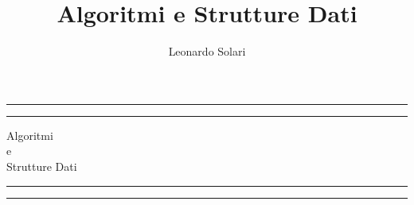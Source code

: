 \documentclass[a4paper]{article}
\title{\huge Algoritmi e Strutture Dati}
\author{Leonardo Solari}
\date{}
\begin{document}


\begin{titlepage}
	\centering %
	\scshape %
	\vspace*{1.5\baselineskip} %

	\rule{13cm}{1.6pt}\vspace*{-\baselineskip}\vspace*{2pt} %
	\rule{13cm}{0.4pt} %
	
		\vspace{0.75\baselineskip} %
	{	\Huge Algoritmi \\ 
			\vspace{4mm}  
			e \\
			\vspace{4mm}
		Strutture Dati \\	}
		\vspace{0.75\baselineskip} %
	\rule{13cm}{0.4pt}\vspace*{-\baselineskip}\vspace{3.2pt} %
	\rule{13cm}{1.6pt} %
	

\end{titlepage}
\end{document}
